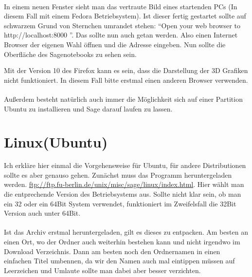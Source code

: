 \documentclass[a4paper,10pt,DIV15]{scrartcl}
\begin{document}
\paragraph{}
In einem neuen Fenster sieht man das vertraute Bild eines startenden PCs (In diesem Fall mit einem Fedora Betriebsystem). 
Ist dieser fertig gestartet sollte auf schwarzem Grund von Sternchen umrandet stehen: 
\textquotedblleft Open your web browser to http://localhost:8000  \textquotedblright.
Das sollte nun auch getan werden. Also einen Internet Browser der eigenen Wahl öffnen und die Adresse eingeben. Nun sollte die Oberfläche des
Sagenotebooks zu sehen sein. 


Mit der Version 10 des Firefox kann es sein, dass die Darstellung der 3D Grafiken nicht funktioniert. In diesem Fall bitte erstmal einen anderen
Browser verwenden.
\paragraph{}
Außerdem besteht natürlich auch immer die Möglichkeit sich auf einer Partition Ubuntu zu installieren und Sage darauf laufen zu lassen.




\section{Linux(Ubuntu)}
Ich erkläre hier einmal die Vorgehensweise für Ubuntu, für andere Distributionen sollte es aber genauso gehen.
Zunächst muss das Programm heruntergeladen werden. \url{ftp://ftp.fu-berlin.de/unix/misc/sage/linux/index.html}. Hier wählt man die 
entprechende Version des Betriebsystems aus. Sollte nicht klar sein, ob man ein 32 oder ein 64Bit System verwendet, funktioniert
im Zweifelsfall die 32Bit Version auch unter 64Bit. 
\paragraph{}
Ist das Archiv erstmal heruntergeladen, gilt es dieses zu entpacken. Am besten an einen Ort, wo der Ordner auch weiterhin bestehen kann
und nicht irgendwo im Download Verzeichnis. Dann am besten noch den Ordnernamen in einen einfachen Titel umbennen, da wir den Namen 
auch mal eintippen müssen auf Leerzeichen und Umlaute sollte man dabei aber besser verzichten.
\end{document}
